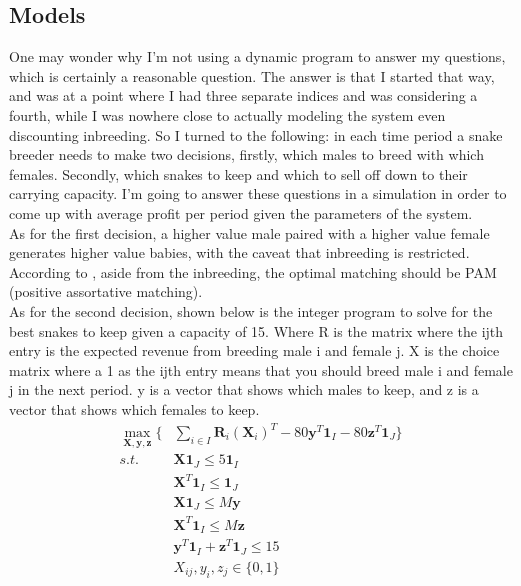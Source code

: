 \documentclass{paper}
\begin{document}
\begin{spacing}{1.5}
\section*{Models}
	\indent\indent One may wonder why I'm not using a dynamic program to answer my questions, which is certainly a reasonable question. The answer is that I started that way, and was at a point where I had three separate indices and was considering a fourth, while I was nowhere close to actually modeling the system even discounting inbreeding. So I turned to the following: in each time period a snake breeder needs to make two decisions, firstly, which males to breed with which females. Secondly, which snakes to keep and which to sell off down to their carrying capacity. I'm going to answer these questions in a simulation in order to come up with average profit per period given the parameters of the system.\\
	\indent As for the first decision, a higher value male paired with a higher value female generates higher value babies, with the caveat that inbreeding is restricted. According to \cite{becker}, aside from the inbreeding, the optimal matching should be PAM (positive assortative matching).\\
	\indent As for the second decision, shown below is the integer program to solve for the best snakes to keep given a capacity of 15. Where R is the matrix where the ijth entry is the expected revenue from breeding male i and female j. X is the choice matrix where a 1 as the ijth entry means that you should breed male i and female j in the next period. y is a vector that shows which males to keep, and z is a vector that shows which females to keep.
	\begin{align*}
      \max_{\mathbf{X},\mathbf{y},\mathbf{z}}\{ &\sum_{i\in I}\mathbf R_i (\mathbf X_i)^T - 80\mathbf y^T\mathbf 1_I - 80\mathbf z^T\mathbf 1_J \}\\
      s.t. \quad& \mathbf X\mathbf 1_J \leq 5\mathbf 1_I \\
      & \mathbf X^T \mathbf 1_I \leq \mathbf1_J\\
      & \mathbf X \mathbf1_J\leq M\mathbf y\\
      & \mathbf X^T\mathbf 1_I \leq M\mathbf z\\
      & \mathbf y^T\mathbf 1_I + \mathbf z^T\mathbf 1_J \leq 15\\
      & X_{ij}, y_i, z_j \in \{0,1\}
    \end{align*}

\end{spacing}
\end{document}
